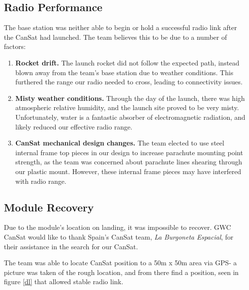 \documentclass[]{report}
\begin{document}
	\subsection{Radio Performance}
	
	The base station was neither able to begin or hold a successful radio link after the CanSat had launched. The team believes this to be due to a number of factors:
	
	\begin{enumerate}
		\item \textbf{Rocket drift.} The launch rocket did not follow the expected path, instead blown away from the team's base station due to weather conditions. This furthered the range our radio needed to cross, leading to connectivity issues. \\
		\item \textbf{Misty weather conditions.} Through the day of the launch, there was high atmospheric relative humidity, and the launch site proved to be very misty. Unfortunately, water is a fantastic absorber of electromagnetic radiation, and likely reduced our effective radio range. \\
		\item \textbf{CanSat mechanical design changes.} The team elected to use steel internal frame top pieces in our design to increase parachute mounting point strength, as the team was concerned about parachute lines shearing through our plastic mount. However, these internal frame pieces may have interfered with radio range.
	\end{enumerate}

	\subsection{Module Recovery}
	
	Due to the module's location on landing, it was impossible to recover. GWC CanSat would like to thank Spain's CanSat team, \textit{La Burgoneta Espacial}, for their assistance in the search for our CanSat. 
	
	The team was able to locate CanSat position to a 50m x 50m area via GPS- a picture was taken of the rough location, and from there find a position, seen in figure \ref{dl} that allowed stable radio link.
	
\end{document}
